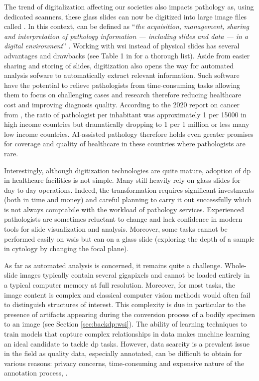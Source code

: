 The trend of digitalization affecting our societies also impacts pathology as, using dedicated scanners, these glass slides can now be digitized into large image files called . In this context,  can be defined as ``\textit{the acquisition, management, sharing and interpretation of pathology information — including slides and data — in a digital environment}'' \parencite{doolan2019whatisdp}. Working with \acrshort{wsi} instead of physical slides has several advantages and drawbacks (see Table 1 in \parencite{jahn2020digital} for a thorough list). Aside from easier sharing and storing of slides, digitization also opens the way for automated analysis sofware to automatically extract relevant information. Such software have the potential to relieve pathologists from time-consuming tasks allowing them to focus on challenging cases and research therefore reducing healthcare cost and improving diagnosis quality. According to the 2020 report on cancer from  \parencite{world2020report}, the ratio of pathologist per inhabitant was approximately 1 per 15000 in high income countries but dramatically dropping to 1 per 1 million or less many low income countries. AI-assisted pathology therefore holds even greater promises for coverage and quality of healthcare in these countries where pathologists are rare.

Interestingly, although digitization technologies are quite mature, adoption of \acrlong{dp} in healthcare facilities is not simple. Many still heavily rely on glass slides for day-to-day operations. Indeed, the transformation requires significant investments (both in time and money) and careful planning to carry it out successfully which is not always comptabile with the workload of pathology services. Experienced pathologists are sometimes reluctant to change and lack confidence in modern tools for slide visualization and analysis. Moreover, some tasks cannot be performed easily on \acrlong{wsi}s but can on a glass slide (\eg exploring the depth of a sample in cytology by changing the focal plane). 

As far as automated analysis is concerned, it remains quite a challenge. Whole-slide images typically contain several gigapixels and cannot be loaded entirely in a typical computer memory at full resolution. Moreover, for most tasks, the image content is complex and classical computer vision methods would often fail to distinguish structures of interest. This complexity is due in particular to the presence of artifacts \parencite{taqi2018review} appearing during the conversion process of a bodily specimen to an image (see Section \ref{sec:backdp:wsi}). The ability of learning techniques to train models that capture complex relationships in data makes machine learning an ideal candidate to tackle \acrlong{dp} tasks. However, data scarcity is a prevalent issue in the field as quality data, especially annotated, can be difficult to obtain for various reasons: privacy concerns, time-consuming and expensive nature of the annotation process, \etc.     

